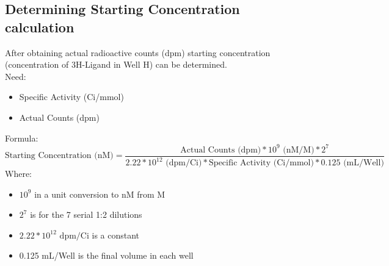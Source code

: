 \documentclass[12pt, letterpaper]{article}
\begin{document}
\subsection{Determining Starting Concentration calculation}
After obtaining actual radioactive counts (dpm) starting concentration (concentration of 3H-Ligand in Well H) can be determined.
\\Need:
\begin{itemize}
    \item Specific Activity (Ci/mmol)
    \item Actual Counts (dpm)
\end{itemize}
Formula:
\[\text{Starting Concentration (nM)} = \frac{\text{Actual Counts (dpm)} * 10^9 \text{ (nM/M)} * 2^7}{2.22*10^{12} \text{ (dpm/Ci)} * \text{Specific Activity (Ci/mmol)} * 0.125 \text{ (mL/Well)}}\]
Where:
\begin{itemize}
    \item $10^9$ in a unit conversion to nM from M
    \item $2^7$ is for the 7 serial 1:2 dilutions
    \item $2.22*10^{12} \text{ dpm/Ci}$ is a constant
    \item 0.125 mL/Well is the final volume in each well
\end{itemize}
\end{document}
